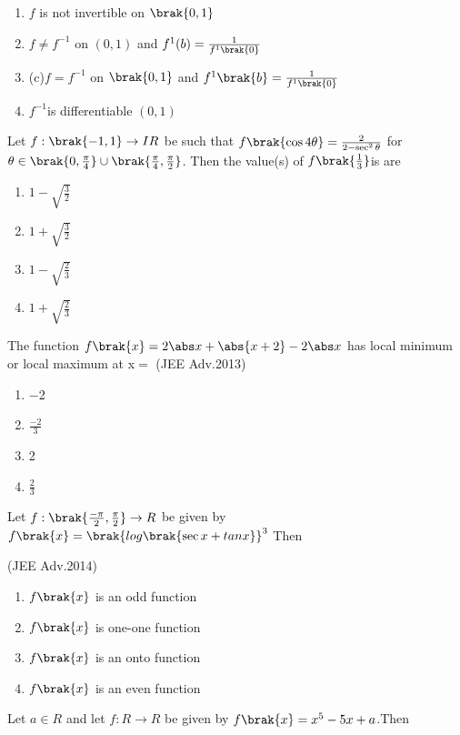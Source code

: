 \begin{enumerate}
\item $f$ is not invertible  on $\brak{0,1}$
\item$f\neq{f^{-1}}$ on $(0,1)$ and $f^{1}(b)=\frac{1}{f^{1}\brak{0}}$
\item(c)$f=f^{-1}$ on $\brak{0,1}$ and $f^{1}\brak{b}=\frac{1}{f^{1}\brak{0}}$
\item$f^{-1} $is differentiable $(0,1)$
\end{enumerate}
\item Let $f:\brak{-1,1}\rightarrow{IR}$ be  such that $f\brak{\cos{4\theta}} =\frac{2}{2-\sec^2{\theta}}$ for $\theta \in \brak{0,\frac{\pi}{4}}\cup\brak{\frac{\pi}{4},\frac{\pi}{2}}$. Then the value(s) of $f\brak{\frac{1}{3}}$is are
\begin{multicols}{2}
\begin{enumerate} 
\item $1-\sqrt{\frac{3}{2}}$  
\item $1+\sqrt{\frac{3}{2}}$
\item $1-\sqrt{\frac{2}{3}}$   
\item $1+\sqrt{\frac{2}{3}}$
\end{enumerate}
\end{multicols}
\item The function $f\brak{x}=2\abs x+\abs {x+2}-2\abs x$ has local minimum or local maximum at x$=$
\hfill(JEE Adv.2013)
\begin{multicols}{4}
\begin{enumerate}
\item $-$2
\item $\frac{-2}{3}$
\item 2
\item$\frac{2}{3}$
\end{enumerate}
\end{multicols}
\item Let $f:\brak{\frac{-\pi}{2},\frac{\pi}{2}}\rightarrow{R}$ be given by $f\brak{x}=\brak{log\brak{\sec{x}+tan{x}}}^3$ Then

\hfill(JEE Adv.2014)
\begin{enumerate} 
\item$f\brak{x}$ is an odd function
\item$f\brak{x}$ is one-one function
\item$f\brak{x}$ is an onto function
\item$f\brak{x}$ is an even function
\end{enumerate}
\item Let $a \in R$ and let $f:R\rightarrow{R}$ be given by $f\brak{x}=x^5-5x+a$.Then

